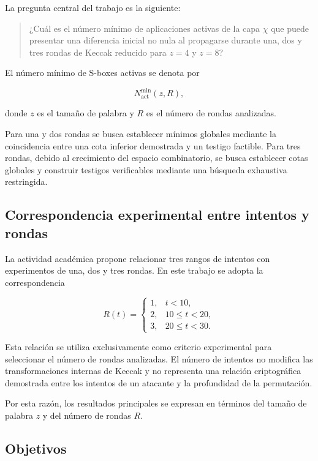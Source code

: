 La pregunta central del trabajo es la siguiente:

\begin{quote}
¿Cuál es el número mínimo de aplicaciones activas de la capa $\chi$ que
puede presentar una diferencia inicial no nula al propagarse durante una,
dos y tres rondas de Keccak reducido para $z=4$ y $z=8$?
\end{quote}

El número mínimo de S-boxes activas se denota por

\[
N_{\mathrm{act}}^{\min}(z,R),
\]

donde $z$ es el tamaño de palabra y $R$ es el número de rondas analizadas.

Para una y dos rondas se busca establecer mínimos globales mediante la
coincidencia entre una cota inferior demostrada y un testigo factible. Para
tres rondas, debido al crecimiento del espacio combinatorio, se busca
establecer cotas globales y construir testigos verificables mediante una
búsqueda exhaustiva restringida.


\subsection{Correspondencia experimental entre intentos y rondas}
\label{subsec:intentos_rondas}

La actividad académica propone relacionar tres rangos de intentos con
experimentos de una, dos y tres rondas. En este trabajo se adopta la
correspondencia

\[
R(t)=
\begin{cases}
1, & t < 10,\\
2, & 10 \leq t < 20,\\
3, & 20 \leq t < 30.
\end{cases}
\]

Esta relación se utiliza exclusivamente como criterio experimental para
seleccionar el número de rondas analizadas. El número de intentos no modifica
las transformaciones internas de Keccak y no representa una relación
criptográfica demostrada entre los intentos de un atacante y la profundidad
de la permutación.

Por esta razón, los resultados principales se expresan en términos del
tamaño de palabra $z$ y del número de rondas $R$.


\subsection{Objetivos}
\label{subsec:objetivos}

